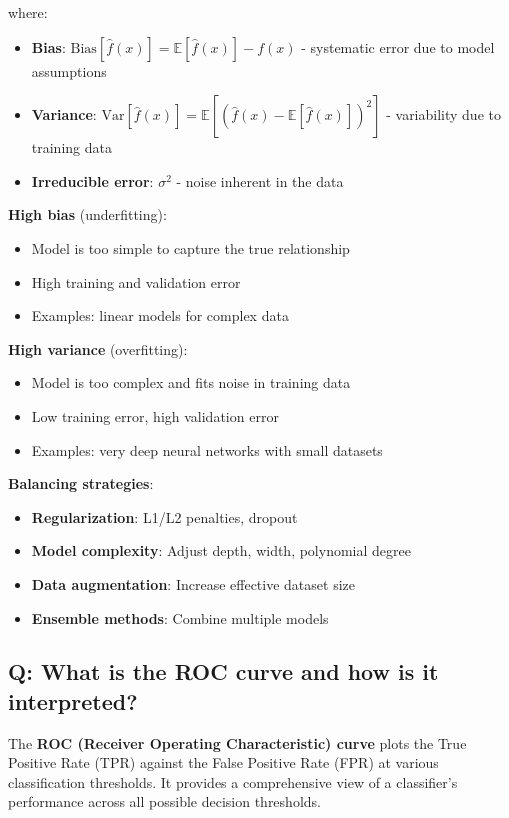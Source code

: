 where:
\begin{itemize}
	\item \textbf{Bias}: \(\text{Bias}[\hat{f}(x)] = \mathbb{E}[\hat{f}(x)] - f(x)\) - systematic error due to model assumptions
	\item \textbf{Variance}: \(\text{Var}[\hat{f}(x)] = \mathbb{E}[(\hat{f}(x) - \mathbb{E}[\hat{f}(x)])^2]\) - variability due to training data
	\item \textbf{Irreducible error}: \(\sigma^2\) - noise inherent in the data
\end{itemize}

\textbf{High bias} (underfitting):
\begin{itemize}
	\item Model is too simple to capture the true relationship
	\item High training and validation error
	\item Examples: linear models for complex data
\end{itemize}

\textbf{High variance} (overfitting):
\begin{itemize}
	\item Model is too complex and fits noise in training data
	\item Low training error, high validation error
	\item Examples: very deep neural networks with small datasets
\end{itemize}

\textbf{Balancing strategies}:
\begin{itemize}
	\item \textbf{Regularization}: L1/L2 penalties, dropout
	\item \textbf{Model complexity}: Adjust depth, width, polynomial degree
	\item \textbf{Data augmentation}: Increase effective dataset size
	\item \textbf{Ensemble methods}: Combine multiple models
\end{itemize}

\subsection*{Q: What is the ROC curve and how is it interpreted?}
The \textbf{ROC (Receiver Operating Characteristic) curve} plots the True Positive Rate (TPR) against the False Positive Rate (FPR) at various classification thresholds. It provides a comprehensive view of a classifier's performance across all possible decision thresholds.

